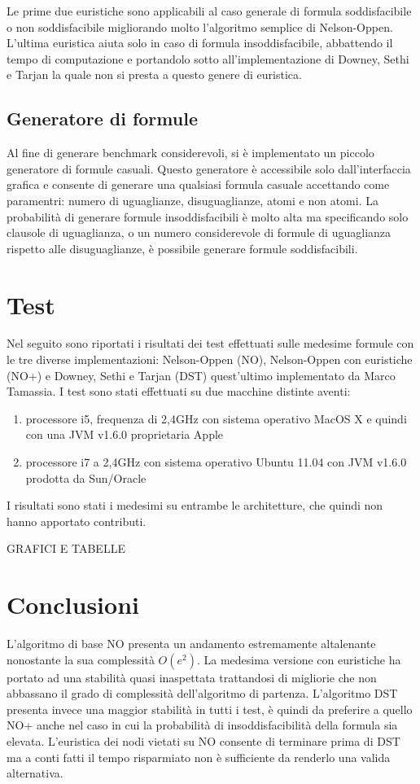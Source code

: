 \documentclass[a4paper,11pt]{article}
\begin{document}
Le prime due euristiche sono applicabili al caso generale di formula soddisfacibile o non soddisfacibile migliorando molto l'algoritmo semplice di Nelson-Oppen.
L'ultima euristica aiuta solo in caso di formula insoddisfacibile, abbattendo il tempo di computazione e portandolo sotto all'implementazione di Downey, Sethi e Tarjan la quale non si presta a questo genere di euristica.
\subsection{Generatore di formule}
Al fine di generare benchmark considerevoli, si è implementato un piccolo generatore di formule casuali.
Questo generatore è accessibile solo dall'interfaccia grafica e consente di generare una qualsiasi formula casuale accettando come paramentri: numero di uguaglianze, disuguaglianze, atomi e non atomi.
La probabilità di generare formule insoddisfacibili è molto alta ma specificando solo clausole di uguaglianza, o un numero considerevole di formule di uguaglianza rispetto alle disuguaglianze, è possibile generare formule soddisfacibili.
\section{Test}
Nel seguito sono riportati i risultati dei test effettuati sulle medesime formule con le tre diverse implementazioni: Nelson-Oppen (NO), Nelson-Oppen con euristiche (NO+) e Downey, Sethi e Tarjan (DST) quest'ultimo implementato da Marco Tamassia.
I test sono stati effettuati su due macchine distinte aventi:
\begin{enumerate}
	\item processore i5, frequenza di 2,4GHz con sistema operativo MacOS X e quindi con una JVM v1.6.0 proprietaria Apple
	\item processore i7 a 2,4GHz con sistema operativo Ubuntu 11.04 con JVM v1.6.0 prodotta da Sun/Oracle
\end{enumerate}
I risultati sono stati i medesimi su entrambe le architetture, che quindi non hanno apportato contributi.

GRAFICI E TABELLE

\section{Conclusioni}
L'algoritmo di base NO presenta un andamento estremamente altalenante nonostante la sua complessità $O(e^2)$.
La medesima versione con euristiche ha portato ad una stabilità quasi inaspettata trattandosi di migliorie che non abbassano il grado di complessità dell'algoritmo di partenza.
L'algoritmo DST presenta invece una maggior stabilità in tutti i test, è quindi da preferire a quello NO+ anche nel caso in cui la probabilità di insoddisfacibilità della formula sia elevata.
L'euristica dei nodi vietati su NO consente di terminare prima di DST ma a conti fatti il tempo risparmiato non è sufficiente da renderlo una valida alternativa.
\end{document}
